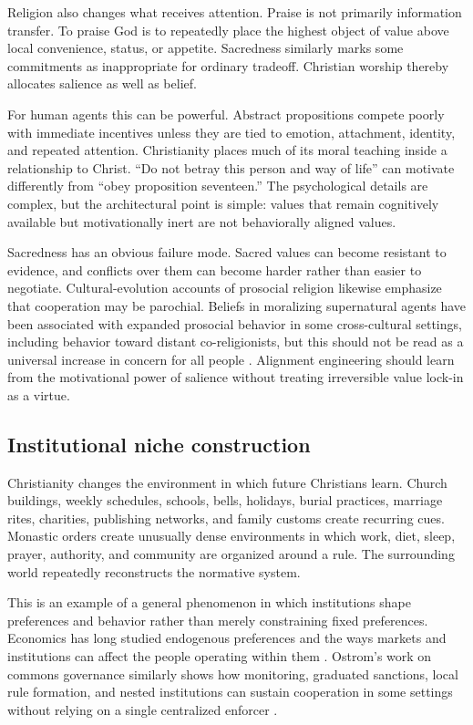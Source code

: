 \documentclass[11pt]{article}
\begin{document}
Religion also changes what receives attention. Praise is not primarily information transfer. To praise God is to repeatedly place the highest object of value above local convenience, status, or appetite. Sacredness similarly marks some commitments as inappropriate for ordinary tradeoff. Christian worship thereby allocates salience as well as belief.

For human agents this can be powerful. Abstract propositions compete poorly with immediate incentives unless they are tied to emotion, attachment, identity, and repeated attention. Christianity places much of its moral teaching inside a relationship to Christ. ``Do not betray this person and way of life'' can motivate differently from ``obey proposition seventeen.'' The psychological details are complex, but the architectural point is simple: values that remain cognitively available but motivationally inert are not behaviorally aligned values.

Sacredness has an obvious failure mode. Sacred values can become resistant to evidence, and conflicts over them can become harder rather than easier to negotiate. Cultural-evolution accounts of prosocial religion likewise emphasize that cooperation may be parochial. Beliefs in moralizing supernatural agents have been associated with expanded prosocial behavior in some cross-cultural settings, including behavior toward distant co-religionists, but this should not be read as a universal increase in concern for all people \parencite{purzycki2016moralistic,norenzayan2016prosocial}. Alignment engineering should learn from the motivational power of salience without treating irreversible value lock-in as a virtue.

\subsection{Institutional niche construction}

Christianity changes the environment in which future Christians learn. Church buildings, weekly schedules, schools, bells, holidays, burial practices, marriage rites, charities, publishing networks, and family customs create recurring cues. Monastic orders create unusually dense environments in which work, diet, sleep, prayer, authority, and community are organized around a rule. The surrounding world repeatedly reconstructs the normative system.

This is an example of a general phenomenon in which institutions shape preferences and behavior rather than merely constraining fixed preferences. Economics has long studied endogenous preferences and the ways markets and institutions can affect the people operating within them \parencite{bowles1998endogenous}. Ostrom's work on commons governance similarly shows how monitoring, graduated sanctions, local rule formation, and nested institutions can sustain cooperation in some settings without relying on a single centralized enforcer \parencite{ostrom1990commons}.
\end{document}
